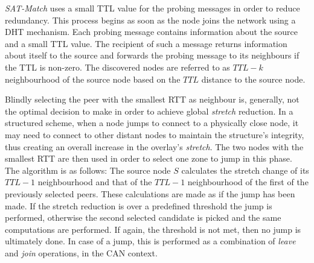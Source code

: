 \documentclass[acmcsur,acmnow]{acmtrans2m}
\begin{document}
\emph{SAT-Match} uses a small TTL value for the probing messages in order to
reduce redundancy\cite{jiang_lightflood_2008}. This process begins as soon as
the node joins the network using a DHT mechanism. Each probing message contains
information about the source and a small TTL value. The recipient of such a
message returns information about itself to the source and forwards the probing
message to its neighbours if the TTL is non-zero. The discovered nodes are
referred to as $TTL-k$ neighbourhood of the source node based on the $TTL$ distance
to the source node. 

Blindly selecting the peer with the smallest RTT as neighbour is, generally, not
the optimal decision to make in order to achieve global \emph{stretch} reduction.
In a structured scheme, when a node jumps to connect to a
physically close node, it may need to connect to other distant nodes to maintain
the structure's integrity, thus creating an overall increase in the overlay's
\emph{stretch}. The two nodes with the smallest RTT are then used in order to
select one zone to jump in this phase. The algorithm is as follows: The source
node $S$ calculates the stretch change of its $TTL-1$ neighbourhood and that of
the $TTL-1$ neighbourhood of the first of the previously selected peers. These
calculations are made as if the jump has been made. If the stretch reduction is
over a predefined threshold the jump is performed, otherwise the second selected
candidate is picked and the same computations are performed. If again, the
threshold is not met, then no jump is ultimately done. In case of a jump, this
is performed as a combination of \emph{leave} and \emph{join} operations, in the
CAN context.
\end{document}
